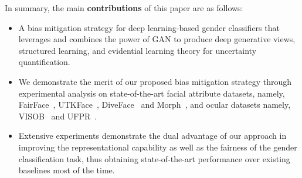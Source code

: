 \documentclass[runningheads]{llncs}
\begin{document}
In summary, the main \textbf{contributions} of this paper are as follows:

\begin{itemize}
\item A bias mitigation strategy for deep learning-based gender classifiers that leverages and combines the power of GAN to produce deep generative views, structured learning, and evidential learning theory for uncertainty quantification. 

\item We demonstrate the merit of our proposed bias mitigation strategy through experimental analysis on state-of-the-art facial attribute datasets, namely, FairFace~\cite{fairface}, UTKFace~\cite{utkface}, DiveFace~\cite{diveface} and Morph~\cite{morph}, and ocular datasets namely, VISOB~\cite{visob} and UFPR~\cite{ufpr}.

\item Extensive experiments demonstrate the dual advantage of our approach in improving the representational capability as well as the fairness of the gender classification task, thus obtaining state-of-the-art performance over existing baselines most of the time.

\end{itemize}

\begin{comment}
is to explore leveraging the power of a GAN to produce deep generative views of a given real image. Using these generative views such as altering of pose, shape or colour based on the variation a GAN learns, metric learning is used improve the representational ability as well as fairness of the model. Specifically, in this paper we investigate the following techniques to improve the fairness of a model:
\begin{itemize}
    \item \textbf{Metric Learning based optimization}, where a GAN model is used to create generative views of the input image and uses a metric loss for optimization
    \item \textbf{An Evidential deep learning based rejection method}, where an evidential loss term and final layer is added to the model, which can be used to estimate uncertainty and therefore as a threshold for reject option.
    \end{itemize}
    
\end{comment}  
    
\end{document}
